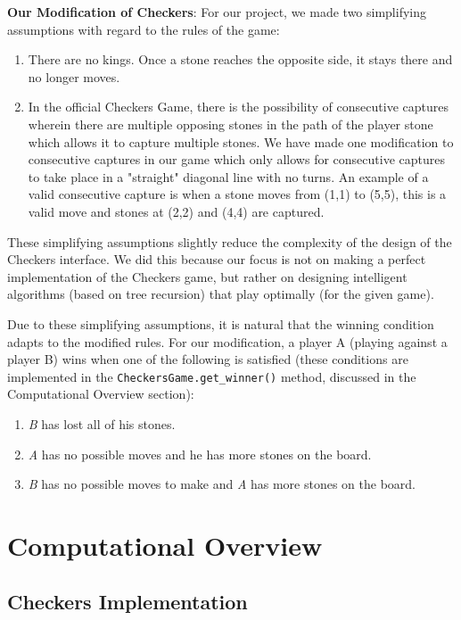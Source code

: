 \documentclass[fontsize=11pt]{article}
\begin{document}
\textbf{Our Modification of Checkers}: For our project, we made two simplifying assumptions with regard to the rules of the game:
\begin{enumerate}
    \item There are no kings. Once a stone reaches the opposite side, it stays there and no longer moves. 

    \item In the official Checkers Game, there is the possibility of consecutive captures wherein there are multiple opposing stones in the path of the player stone which allows it to capture multiple stones. We have made one modification to consecutive captures in our game which only allows for consecutive captures to take place in a "straight" diagonal line with no turns. An example of a valid consecutive capture is when a stone moves from (1,1) to (5,5), this is a valid move and stones at (2,2) and (4,4) are captured. 
\end{enumerate}

These simplifying assumptions slightly reduce the complexity of the design of the Checkers interface. We did this because our focus is not on making a perfect implementation of the Checkers game, but rather on designing intelligent algorithms (based on tree recursion) that play optimally (for the given game).

Due to these simplifying assumptions, it is natural that the winning condition adapts to the modified rules. For our modification, a player A (playing against a player B) wins when one of the following is satisfied (these conditions are implemented in the \texttt{CheckersGame.get\_winner()} method, discussed in the Computational Overview section):
\begin{enumerate}
    \item \textit{B} has lost all of his stones.

    \item \textit{A} has no possible moves and he has more stones on the board.

    \item \textit{B} has no possible moves to make and \textit{A} has more stones on the board.
\end{enumerate}


\section*{Computational Overview}

\subsection*{Checkers Implementation}
\end{document}
